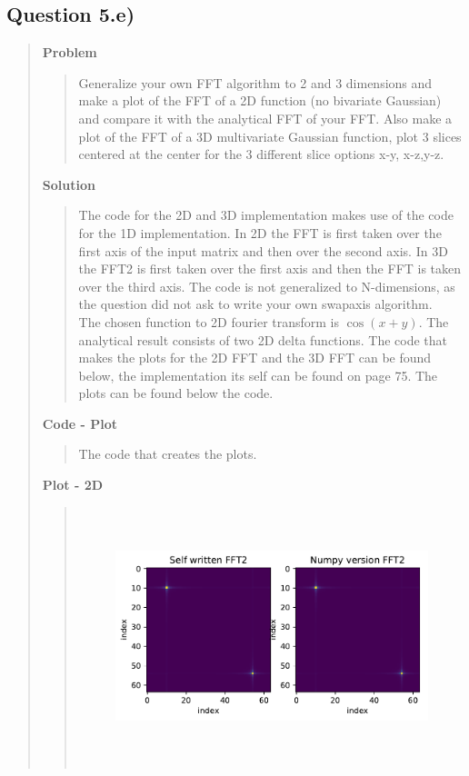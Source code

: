 
\subsection*{\textbf{Question 5.e)}}
\begin{quote}

\textbf{Problem}
\begin{quote}
Generalize your own FFT algorithm to 2 and 3 dimensions and make a plot of the FFT of a 2D function (no bivariate Gaussian) and compare it with the analytical FFT of your FFT. Also make a plot of the FFT of a 3D multivariate Gaussian function, plot 3 slices centered at the center for the 3 different slice options x-y, x-z,y-z.
\end{quote}

\textbf{Solution} 
\begin{quote}

The code for the 2D and 3D implementation makes use of the code for the 1D implementation. In 2D the FFT is first taken over the first axis of the input matrix and then over the second axis. In 3D the FFT2 is first taken over the first axis and then the FFT is taken over the third axis. 
The code is not generalized to N-dimensions, as the question did not ask to write your own swapaxis algorithm. 
\\
The chosen function to 2D fourier transform is $\cos(x+y)$. The analytical result consists of two 2D delta functions. The code that makes the plots for the 2D FFT and the 3D FFT can be found below, the implementation its self can be found on page 75. The plots can be found below the code.
\end{quote}
\newpage

\textbf{Code - Plot}
\begin{quote}
The code that creates the plots.

\end{quote}

\textbf{Plot - 2D}\\
\begin{quote}

\begin{figure}[!ht]
\centering
\includegraphics[width=15cm, height=7.5cm]{./Plots/5e_2d_fft.pdf}


\end{figure}
\end{quote}
\end{quote}
